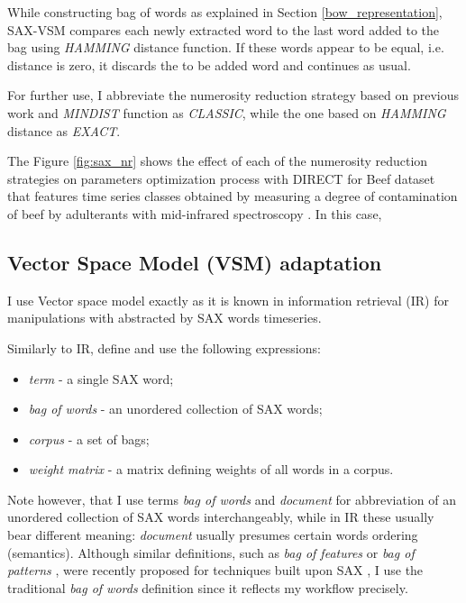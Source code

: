 While constructing bag of words as explained in Section \ref{bow_representation},  SAX-VSM compares each newly 
extracted word to the last word added to the bag using \textit{HAMMING} distance function.
If these words appear to be equal, i.e. distance is zero, it discards the to be added word and continues as usual. 

For further use, I abbreviate the numerosity reduction strategy based on previous work and \textit{MINDIST} 
function as \textit{CLASSIC}, while the one based on \textit{HAMMING} distance as \textit{EXACT}.

The Figure \ref{fig:sax_nr} shows the effect of each of the numerosity reduction strategies on parameters optimization
process with DIRECT for Beef dataset that features time series classes obtained by measuring a degree of contamination 
of beef by adulterants with mid-infrared spectroscopy \cite{citeulike:12859637}. In this case, 



\subsection{Vector Space Model (VSM) adaptation}\label{vsm}
I use Vector space model exactly as it is known in information retrieval (IR) \cite{citeulike:300428} for 
manipulations with abstracted by SAX words timeseries. 

Similarly to IR, define and use the following expressions:
\begin{itemize}
  \item \textit{term} - a single SAX word;
  \item \textit{bag of words} - an unordered collection of SAX words;
  \item \textit{corpus} - a set of bags;
  \item \textit{weight matrix} - a matrix defining weights of all words in a corpus.
\end{itemize}
Note however, that I use terms \textit{bag of words} and \textit{document} for abbreviation of an unordered 
collection of SAX words interchangeably, while in IR these usually bear different meaning: \textit{document} 
usually presumes certain words ordering (semantics). 
Although similar definitions, such as \textit{bag of features} \cite{citeulike:12636726} 
or \textit{bag of patterns} \cite{citeulike:10525778}, were recently proposed for techniques built 
upon SAX \cite{citeulike:10525778}, I use the traditional \textit{bag of words} definition since it reflects 
my workflow precisely. 

